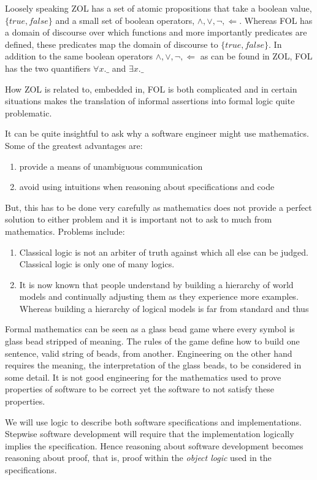 Loosely speaking ZOL has a set of atomic propositions that take a boolean value, $\{true,false\}$ and a small set of boolean operators, $\wedge,\vee,\neg, \Leftarrow$. Whereas FOL has a domain of discourse over which functions and more importantly predicates are defined, these predicates map the domain of discourse to $\{true,false\}$. In addition to the same boolean operators $\wedge,\vee,\neg, \Leftarrow$ as can be found in ZOL, FOL has the two quantifiers $\forall x.\_$  and  $\exists x.\_$ 

How ZOL is related to, embedded in, FOL is both complicated and in certain situations makes the translation of informal assertions into formal logic quite problematic. 


It can be quite insightful to ask why a software  engineer might use mathematics. Some of the greatest advantages are:
\begin{enumerate}
\item provide a means of unambiguous communication
\item avoid using intuitions when reasoning about specifications and code
\end{enumerate}
But, this has to be done very carefully as mathematics does not provide a perfect solution to either problem and it is important not to ask to much from mathematics. Problems include: 
\begin{enumerate}
\item Classical logic is not an arbiter of truth against which all else can be judged. Classical logic is only one of many logics.
\item It is now known that people understand by building a hierarchy of world models and continually adjusting them as they experience more examples. Whereas building a hierarchy of logical models is far from standard and thus 
\end{enumerate} 

Formal mathematics can be seen as a glass bead game where every symbol is glass bead stripped of meaning. The rules of the game define how to build one sentence, valid string of beads,  from another. Engineering on the other hand  requires the meaning, the interpretation of the glass beads, to be considered in some detail. It is not good engineering for the mathematics used to  prove properties of  software to be correct yet the 
software to not satisfy these properties.

We will use logic to describe both software specifications and implementations. Stepwise software development will require that the implementation logically implies the specification. Hence reasoning about software development becomes reasoning about proof, that is, proof within the \emph{object logic} used in the specifications.

